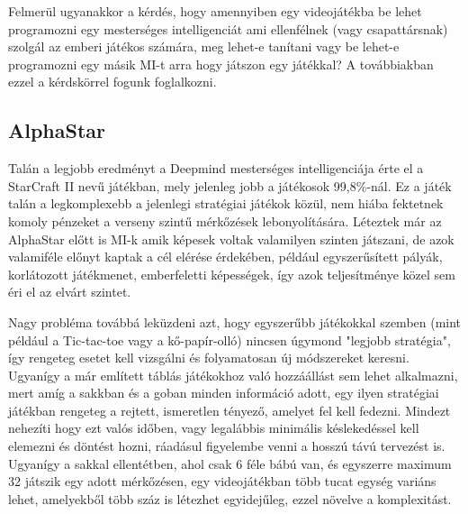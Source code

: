 Felmerül ugyanakkor a kérdés, hogy amennyiben egy videojátékba be lehet programozni egy mesterséges intelligenciát ami ellenfélnek (vagy csapattársnak) szolgál az emberi játékos számára, meg lehet-e tanítani vagy be lehet-e programozni egy másik MI-t arra hogy játszon egy játékkal? A továbbiakban ezzel a kérdskörrel fogunk foglalkozni.


\subsection{AlphaStar}
Talán a legjobb eredményt a Deepmind mesterséges intelligenciája érte el a StarCraft II nevű játékban, mely jelenleg jobb a játékosok 99,8\%-nál. 
Ez a játék talán a legkomplexebb a jelenlegi stratégiai játékok közül, nem hiába fektetnek komoly pénzeket a verseny szintű mérkőzések lebonyolítására.
Léteztek már az AlphaStar előtt is MI-k amik képesek voltak valamilyen szinten játszani, de azok valamiféle előnyt kaptak a cél elérése érdekében, például egyszerűsített pályák, korlátozott játékmenet, emberfeletti képességek, így azok teljesítménye közel sem éri el az elvárt szintet.

Nagy probléma továbbá leküzdeni azt, hogy egyszerűbb játékokkal szemben (mint például a Tic-tac-toe vagy a kő-papír-olló) nincsen úgymond "legjobb stratégia", így rengeteg esetet kell vizsgálni és folyamatosan új módszereket keresni. Ugyanígy a már említett táblás játékokhoz való hozzáállást sem lehet alkalmazni, mert amíg a sakkban és a goban minden információ adott, egy ilyen stratégiai játékban rengeteg a rejtett, ismeretlen tényező, amelyet fel kell fedezni. Mindezt nehezíti hogy ezt valós időben, vagy legalábbis minimális késlekedéssel kell elemezni és döntést hozni, ráadásul figyelembe venni a hosszú távú tervezést is. Ugyanígy a sakkal ellentétben, ahol csak 6 féle bábú van, és egyszerre maximum 32 játszik egy adott mérkőzésen, egy videojátékban több tucat egység variáns lehet, amelyekből több száz is létezhet egyidejűleg, ezzel növelve a komplexitást.


